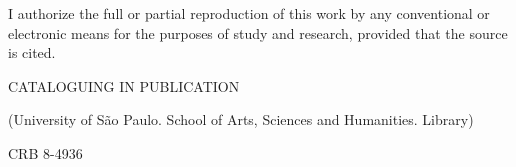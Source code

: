 

\imprimircapa


\imprimirfolhaderosto


\begin{fichacatalografica}
I authorize the full or partial reproduction of this work by any conventional or electronic means for the purposes of study and research, provided that the source is cited.
\small


\vfill
\begin{center}
CATALOGUING IN PUBLICATION

(University of São Paulo. School of Arts, Sciences and Humanities. Library)

{\tiny CRB 8-4936}

\medskip
\ABNTEXfontereduzida
\setlength{\fboxsep}{1cm}
\end{center}
\vspace{\hugeskipamount}
\end{fichacatalografica}

